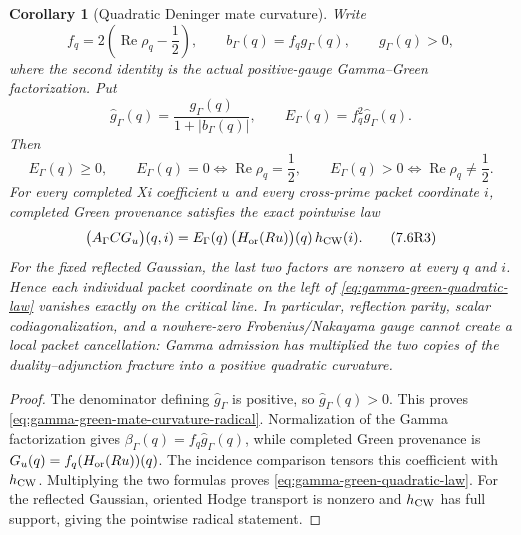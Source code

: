 \documentclass[11pt]{article}
\newtheorem{corollary}[theorem]{Corollary}
\theoremstyle{definition}
\theoremstyle{remark}
\newcommand{\Rea}{\operatorname{Re}}
\begin{document}
\begin{corollary}[Quadratic Deninger mate curvature]
\label{cor:gamma-green-quadratic-mate-curvature}
Write
\[
 f_q=2\left(\Rea\rho_q-\frac12\right),
 \qquad
 b_\Gamma(q)=f_qg_\Gamma(q),
 \qquad g_\Gamma(q)>0,
\]
where the second identity is the actual positive-gauge Gamma--Green
factorization.  Put
\[
 \widehat g_\Gamma(q)=
 \frac{g_\Gamma(q)}{1+|b_\Gamma(q)|},
 \qquad
 E_\Gamma(q)=f_q^2\widehat g_\Gamma(q).
\tag{7.6R1}\label{eq:gamma-green-mate-curvature}
\]
Then
\[
 E_\Gamma(q)\geq0,
 \qquad
 E_\Gamma(q)=0\Longleftrightarrow\Rea\rho_q=\frac12,
 \qquad
 E_\Gamma(q)>0\Longleftrightarrow\Rea\rho_q\ne\frac12.
\tag{7.6R2}\label{eq:gamma-green-mate-curvature-radical}
\]
For every completed Xi coefficient \(u\) and every cross-prime packet
coordinate \(i\), completed Green provenance satisfies the exact pointwise
law
\[
 \bigl(A_\Gamma C G_u\bigr)(q,i)
 =E_\Gamma(q)\,
   \bigl(H_{\rm or}(Ru)\bigr)(q)\,h_{\rm CW}(i).
\tag{7.6R3}\label{eq:gamma-green-quadratic-law}
\]
For the fixed reflected Gaussian, the last two factors are nonzero at every
\(q\) and \(i\).  Hence each individual packet coordinate on the left of
\eqref{eq:gamma-green-quadratic-law} vanishes exactly on the critical line.
In particular, reflection parity, scalar codiagonalization, and a
nowhere-zero Frobenius/Nakayama gauge cannot create a local packet
cancellation: Gamma admission has multiplied the two copies of the
duality--adjunction fracture into a positive quadratic curvature.
\end{corollary}

\begin{proof}
The denominator defining \(\widehat g_\Gamma\) is positive, so
\(\widehat g_\Gamma(q)>0\).  This proves
\eqref{eq:gamma-green-mate-curvature-radical}.  Normalization of the Gamma
factorization gives
\(\beta_\Gamma(q)=f_q\widehat g_\Gamma(q)\), while completed Green
provenance is
\(G_u(q)=f_q(H_{\rm or}(Ru))(q)\).  The incidence comparison tensors this
coefficient with \(h_{\rm CW}\).  Multiplying the two formulas proves
\eqref{eq:gamma-green-quadratic-law}.  For the reflected Gaussian, oriented
Hodge transport is nonzero and \(h_{\rm CW}\) has full support, giving the
pointwise radical statement.
\end{proof}
\end{document}
